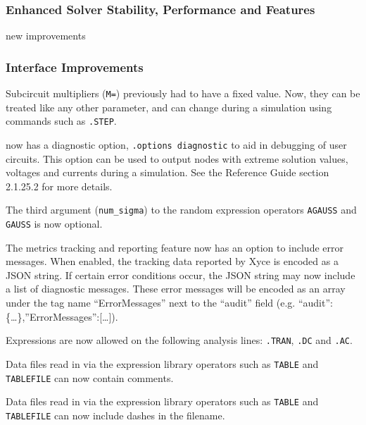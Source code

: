 \documentclass[letterpaper]{scrartcl}
\begin{document}
\subsubsection*{Enhanced Solver Stability, Performance and Features}
\begin{XyceItemize}
\item new improvements 

\end{XyceItemize}

\subsubsection*{Interface Improvements}
\begin{XyceItemize}
\item Subcircuit multipliers (\texttt{M=}) previously had to have a fixed value.  
  Now, they can be treated like any other parameter, and can change during a simulation 
  using commands such as \texttt{.STEP}. 

\item \Xyce{} now has a diagnostic option, \texttt{.options diagnostic} to aid in 
  debugging of user circuits.  This option can be used to output nodes with extreme 
  solution values, voltages and currents during a simulation.  See the Reference 
  Guide section 2.1.25.2 for more details.

\item The third argument (\texttt{num\_sigma}) to the random expression operators \texttt{AGAUSS} and \texttt{GAUSS} is now optional.

\item The metrics tracking and reporting feature now has an option to include 
  error messages. When enabled, the tracking data reported by Xyce is encoded as
  a JSON string. If certain error conditions occur, the JSON string may now
  include a list of diagnostic messages. These error messages will be encoded as
  an array under the tag name “ErrorMessages” next to the “audit” field 
  (e.g. {“audit”:\{\dots\},”ErrorMessages”:[\dots]}). 

\item Expressions are now allowed on the following analysis lines: \texttt{.TRAN}, \texttt{.DC} and \texttt{.AC}.

\item Data files read in via the expression library operators such as \texttt{TABLE} and \texttt{TABLEFILE} can now contain comments.

\item Data files read in via the expression library operators such as \texttt{TABLE} and \texttt{TABLEFILE} can now include dashes in the filename.

\end{XyceItemize}
\end{document}
